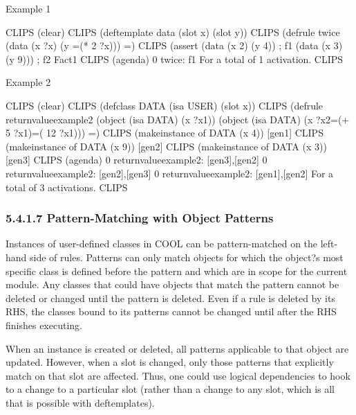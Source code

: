 \documentclass[letterpaper,10pt,english]{sphinxmanual}
\begin{document}
Example 1

\begin{sphinxVerbatim}[commandchars=\\\{\}]
CLIPS\PYGZgt{} (clear)
CLIPS\PYGZgt{} (deftemplate data (slot x) (slot y))
CLIPS\PYGZgt{}
(defrule twice
  (data (x ?x) (y =(\PYGZbs{}* 2 ?x)))
  =\PYGZgt{})
CLIPS\PYGZgt{} (assert (data (x 2) (y 4)) ; f\PYGZhy{}1
(data (x 3) (y 9))) ; f\PYGZhy{}2
\PYGZlt{}Fact\PYGZhy{}1\PYGZgt{}
CLIPS\PYGZgt{} (agenda)
0 twice: f\PYGZhy{}1
For a total of 1 activation.
CLIPS\PYGZgt{}
\end{sphinxVerbatim}

Example 2

\begin{sphinxVerbatim}[commandchars=\\\{\}]
CLIPS\PYGZgt{} (clear)
CLIPS\PYGZgt{}
(defclass DATA (is\PYGZhy{}a USER)
  (slot x))
CLIPS\PYGZgt{}
(defrule return\PYGZhy{}value\PYGZhy{}example\PYGZhy{}2
  (object (is\PYGZhy{}a DATA)
  (x ?x1))
  (object (is\PYGZhy{}a DATA)
  (x ?x2\PYGZam{}=(+ 5 ?x1)\textbar{}=(\PYGZhy{} 12 ?x1)))
  =\PYGZgt{})
CLIPS\PYGZgt{} (make\PYGZhy{}instance of DATA (x 4))
[gen1]
CLIPS\PYGZgt{} (make\PYGZhy{}instance of DATA (x 9))
[gen2]
CLIPS\PYGZgt{} (make\PYGZhy{}instance of DATA (x 3))
[gen3]
CLIPS\PYGZgt{} (agenda)
0 return\PYGZhy{}value\PYGZhy{}example\PYGZhy{}2: [gen3],[gen2]
0 return\PYGZhy{}value\PYGZhy{}example\PYGZhy{}2: [gen2],[gen3]
0 return\PYGZhy{}value\PYGZhy{}example\PYGZhy{}2: [gen1],[gen2]
For a total of 3 activations.
CLIPS\PYGZgt{}
\end{sphinxVerbatim}


\subsubsection{5.4.1.7 Pattern-Matching with Object Patterns}
\label{\detokenize{defrule:pattern-matching-with-object-patterns}}
Instances of user-defined classes in COOL can be pattern-matched on the
left-hand side of rules. Patterns can only match objects for which the
object?s most specific class is defined before the pattern and which are
in scope for the current module. Any classes that could have objects
that match the pattern cannot be deleted or changed until the pattern is
deleted. Even if a rule is deleted by its RHS, the classes bound to its
patterns cannot be changed until after the RHS finishes executing.

When an instance is created or deleted, all patterns applicable to that
object are updated. However, when a slot is changed, only those patterns
that explicitly match on that slot are affected. Thus, one could use
logical dependencies to hook to a change to a particular slot (rather
than a change to any slot, which is all that is possible with
deftemplates).
\end{document}

